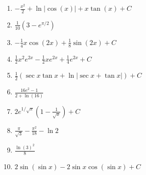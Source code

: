 \documentclass[letterpaper]{article}
\begin{document}
\begin{enumerate}
\begin{enumerate}
	\item $-\frac{x^2}{2}+\ln|\cos(x)|+x \tan(x)+C$

	\item $\frac{1}{10} \left(3-e^{\pi /2}\right)$

	\item $-\frac{1}{4} x \cos(2 x)+\frac{1}{8} \sin(2 x)+C$

	\item $\frac12 x^2 e^{2x}- \frac12xe^{2x}+\frac14e^{2x}+C$

	\item $\frac{1}{2}\left(\sec x \tan x + \ln | \sec x + \tan x| \right)+C$

	\item $\frac{16e^2-1}{2+\ln(16)}$

	\item $2e^{1/\sqrt{x}}\left(1-\frac{1}{\sqrt x}\right)+C$

	\item $\frac{\pi}{\sqrt{3}}-\frac{\pi^2}{18}-\ln 2$

	\item $\frac{\ln(3)^2}{8}$

	\item $2\sin(\sin x)-2\sin x\cos(\sin x)+C$
	\end{enumerate}


\end{enumerate}
\end{document}
